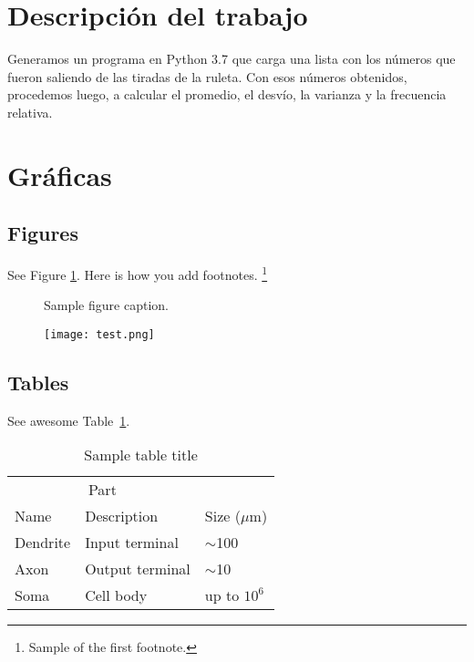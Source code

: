 \section{Descripción del trabajo}
\label{sec:headings}
Generamos un programa en Python 3.7 que carga una lista con los números que fueron saliendo de las tiradas de la ruleta. Con esos números obtenidos, procedemos luego, a calcular el promedio, el desvío, la varianza y la frecuencia relativa.


\section{Gráficas}
 

\subsection{Figures}
\lipsum[10] 
See Figure \ref{fig:fig1}. Here is how you add footnotes. \footnote{Sample of the first footnote.}
\lipsum[11] 

\begin{figure}
  \centering
  \fbox{\rule[-.5cm]{4cm}{4cm} \rule[-.5cm]{4cm}{0cm}}
  \caption{Sample figure caption.}
  \label{fig:fig1}
\end{figure}

\begin{figure} %
    \centering
    \texttt{[image: test.png]}
\end{figure}

\subsection{Tables}
\lipsum[12]
See awesome Table~\ref{tab:table}.

\begin{table}
 \caption{Sample table title}
  \centering
  \begin{tabular}{lll}
    \toprule
    \multicolumn{2}{c}{Part}                   \\
    \cmidrule(r){1-2}
    Name     & Description     & Size ($\mu$m) \\
    \midrule
    Dendrite & Input terminal  & $\sim$100     \\
    Axon     & Output terminal & $\sim$10      \\
    Soma     & Cell body       & up to $10^6$  \\
    \bottomrule
  \end{tabular}
  \label{tab:table}
\end{table}

